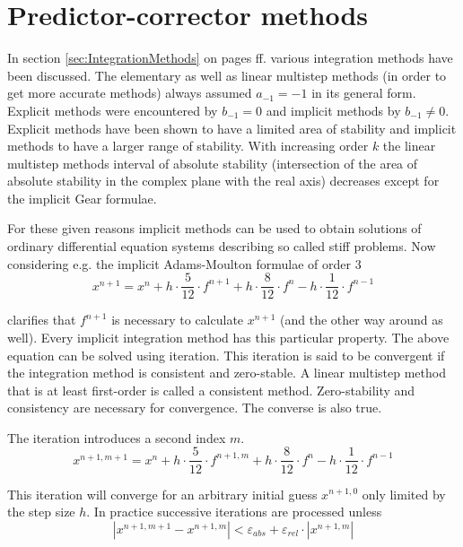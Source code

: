 \section{Predictor-corrector methods}

In section \ref{sec:IntegrationMethods} on pages
\pageref{sec:IntegrationMethods} ff. various integration methods have
been discussed.  The elementary as well as linear multistep methods
(in order to get more accurate methods) always assumed $a_{-1} = -1$
in its general form.  Explicit methods were encountered by $b_{-1} =
0$ and implicit methods by $b_{-1} \ne 0$.  Explicit methods have been
shown to have a limited area of stability and implicit methods to have
a larger range of stability.  With increasing order $k$ the linear
multistep methods interval of absolute stability (intersection of the
area of absolute stability in the complex plane with the real axis)
decreases except for the implicit Gear formulae.

\addvspace{12pt}

For these given reasons implicit methods can be used to obtain
solutions of ordinary differential equation systems describing so
called stiff problems.  Now considering e.g. the implicit
Adams-Moulton formulae of order 3
\begin{equation}
\label{eq:AM3}
x^{n+1} = x^{n} + h\cdot \dfrac{5}{12}\cdot f^{n+1} + h\cdot \dfrac{8}{12}\cdot f^{n} - h\cdot \dfrac{1}{12}\cdot f^{n-1}
\end{equation}

clarifies that $f^{n+1}$ is necessary to calculate $x^{n+1}$ (and the
other way around as well).  Every implicit integration method has this
particular property.  The above equation can be solved using
iteration.  This iteration is said to be convergent if the integration
method is consistent and zero-stable.  A linear multistep method that
is at least first-order is called a consistent method.  Zero-stability
and consistency are necessary for convergence.  The converse is also
true.

\addvspace{12pt}

The iteration introduces a second index $m$.
\begin{equation}
\label{eq:AM3iterate}
x^{n+1,m+1} = x^{n} + h\cdot \dfrac{5}{12}\cdot f^{n+1,m} + h\cdot \dfrac{8}{12}\cdot f^{n} - h\cdot \dfrac{1}{12}\cdot f^{n-1}
\end{equation}

This iteration will converge for an arbitrary initial guess
$x^{n+1,0}$ only limited by the step size $h$.  In practice successive
iterations are processed unless
\begin{equation}
\left|x^{n+1,m+1} - x^{n+1,m}\right| < \varepsilon_{abs} + \varepsilon_{rel}\cdot \left|x^{n+1,m}\right|
\end{equation}

